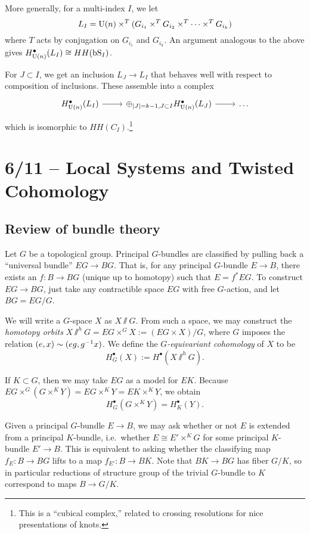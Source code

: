 More generally, for a multi-index $I$, we let
\[
	L_I = \mathrm{U}(n) \times^T (G_{i_1} \times^T G_{i_2} \times^T \dots \times^T G_{i_k})
\]
where $T$ acts by conjugation on $G_{i_1}$ and $G_{i_k}$.
An argument analogous to the above gives $H^\bullet_{\mathrm{U}(n)}(L_I) \cong HH(\mathrm{bS}_I)$.

For $J \subset I$, we get an inclusion $L_J \to L_I$ that behaves well with respect to composition of inclusions.
These assemble into a complex
\[
	\begin{tikzcd}
		H^\bullet_{\U(n)}(L_I) \rar & \oplus_{\abs{J} = k-1, J \subset I} H^\bullet_{\U(n)}(L_J) \rar & \dots 
	\end{tikzcd}
\]
which is isomorphic to $HH(C_I)$.\footnote{This is a ``cubical complex,'' related to crossing resolutions for nice presentations of knots.}

\section{6/11 -- Local Systems and Twisted Cohomology}

\subsection{Review of bundle theory}

Let $G$ be a topological group.
Principal $G$-bundles are classified by pulling back a ``universal bundle'' $EG \to BG$.
That is, for any principal $G$-bundle $E \to B$, there exists an $f: B \to BG$ (unique up to homotopy) such that $E = f^* EG$.
To construct $EG \to BG$, just take any contractible space $EG$ with free $G$-action, and let $BG = EG / G$.

We will write a $G$-space $X$ as $X \sslash G$.
From such a space, we may construct the \emph{homotopy orbits} $X \sslash^h G = EG \times^G X := (EG \times X) / G$, where $G$ imposes the relation $(e, x) \sim (eg, g^{-1} x)$.
We define the \emph{$G$-equivariant cohomology} of $X$ to be
\[
	H^\bullet_G(X) := H^\bullet(X \sslash^h G).
\]

If $K \subset G$, then we may take $EG$ as a model for $EK$.
Because $EG \times^G (G \times^K Y) = EG \times^K Y = EK \times^K Y$, we obtain
\[
	H^\bullet_G(G \times^K Y) = H^\bullet_K(Y).
\]

Given a principal $G$-bundle $E \to B$, we may ask whether or not $E$ is extended from a principal $K$-bundle, i.e.\ whether $E \cong E' \times^K G$ for some principal $K$-bundle $E' \to B$.
This is equivalent to asking whether the classifying map $f_E: B \to BG$ lifts to a map $f_{E'}: B \to BK$.
Note that $BK \to BG$ has fiber $G/K$, so in particular reductions of structure group of the trivial $G$-bundle to $K$ correspond to maps $B \to G / K$.

